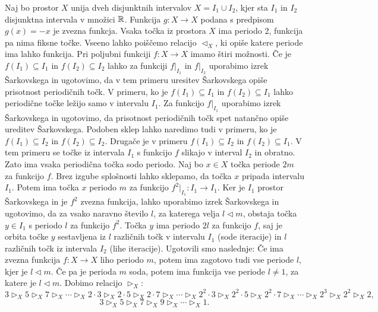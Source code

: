 \documentclass[../TG_magistrsko_delo_sections.tex]{subfiles}
\begin{document}
\begin{primer}
Naj bo prostor $X$ unija dveh disjunktnih intervalov $X=I_1 \cup I_2$, kjer sta $I_1$ in $I_2$ disjunktna intervala v množici $\mathbb R$. Funkcija $g : X \to X$ podana s predpisom $g(x) = -x$ je zvezna funkcja. Vsaka točka iz prostora $X$ ima periodo 2, funkcija pa nima fiksne točke. Vseeno lahko poiščemo relacijo $\triangleleft_X$, ki opiše katere periode ima lahko funkcija.  Pri poljubni funkciji $f: X \to X$ imamo štiri možnosti. Če je $f(I_1) \subseteq I_1$ in $f(I_2) \subseteq I_2$ lahko za funkciji $f|_{I_1}$ in $f|_{I_2}$ uporabimo izrek Šarkovskega in ugotovimo, da v tem primeru uresitev Šarkovskega opiše prisotnost periodičnih točk. V primeru, ko je $f(I_1) \subseteq I_1$ in $f(I_2) \subseteq I_1$ lahko periodične točke ležijo samo v intervalu $I_1$. Za funkcijo $f|_{I_1}$ uporabimo izrek Šarkovskega in ugotovimo, da prisotnost periodičnih točk spet natančno opiše ureditev Šarkovskega. Podoben sklep lahko naredimo tudi v primeru, ko je $f(I_1) \subseteq I_2$ in $f(I_2) \subseteq I_2$. Drugače je v primeru $f(I_1) \subseteq I_2$ in $f(I_2) \subseteq I_1$. V tem primeru se točke iz intervala $I_1$ s funkcijo $f$ slikajo v interval $I_2$ in obratno. Zato ima vsaka periodična točka sodo periodo. Naj bo $x \in X$ točka periode $2m$ za funkcijo $f$. Brez izgube splošnosti lahko sklepamo, da točka $x$ pripada intervalu $I_1$. Potem ima točka $x$ periodo $m$ za funkcijo $f^2|_{I_1} :I_1 \to I_1$. Ker je $I_1$ prostor Šarkovskega in je $f^2$ zvezna funkcija, lahko uporabimo izrek Šarkovskega in ugotovimo, da za vsako naravno število $l$, za katerega velja $l \triangleleft m$, obstaja točka $y \in I_1$ s periodo $l$ za funkcijo $f^2$. Točka $y$ ima periodo $2l$ za funkcijo $f$, saj je orbita točke $y$ sestavljena iz $l$ različnih točk v intervalu $I_1$ (sode iteracije) in $l$ različnih točk iz intervala $I_2$ (lihe iteracije). 
Ugotovili smo naslednje: Če ima zvezna funkcija $f:X \to X$ liho periodo $m$, potem ima zagotovo tudi vse periode $l$, kjer je $l \triangleleft m$. Če pa je perioda $m$ soda, potem ima funkcija vse periode $l\neq1$, za katere je $l \triangleleft m$. 
Dobimo relacijo $\triangleright_X$:
$$3 \triangleright_X 5 \triangleright_X 7 \triangleright_X \cdots \triangleright_X 2\cdot 3 \triangleright_X 2\cdot 5 \triangleright_X 2\cdot 7 \triangleright_X \cdots \triangleright_X 2^2\cdot 3 \triangleright_X 2^2\cdot 5 \triangleright_X 2^2\cdot 7 \triangleright_X \cdots \triangleright_X 2^3 \triangleright_X 2^2 \triangleright_X 2,$$
$$3 \triangleright_X 5 \triangleright_X 7 \triangleright_X 9 \triangleright_X  \cdots \triangleright_X 1.$$
\end{primer}
\end{document}
